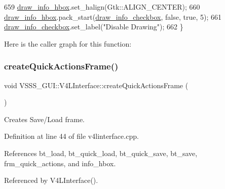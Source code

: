 \begin{DoxyCode}
659         \hyperlink{class_v_s_s_s___g_u_i_1_1_v4_l_interface_a12074ba62f181477daaafc7110edc661}{draw\_info\_hbox}.set\_halign(Gtk::ALIGN\_CENTER);
660         \hyperlink{class_v_s_s_s___g_u_i_1_1_v4_l_interface_a12074ba62f181477daaafc7110edc661}{draw\_info\_hbox}.pack\_start(\hyperlink{class_v_s_s_s___g_u_i_1_1_v4_l_interface_a0bd3c429f8b0d92b2b53353dc31e346e}{draw\_info\_checkbox}, \textcolor{keyword}{false}, \textcolor{keyword}{true}, 5);
661         \hyperlink{class_v_s_s_s___g_u_i_1_1_v4_l_interface_a0bd3c429f8b0d92b2b53353dc31e346e}{draw\_info\_checkbox}.set\_label(\textcolor{stringliteral}{"Disable Drawing"});
662     \}
\end{DoxyCode}
Here is the caller graph for this function\+:
\mbox{\label{class_v_s_s_s___g_u_i_1_1_v4_l_interface_a9e3f937e1515c7b5488520caf924b857}} 
\subsubsection{\texorpdfstring{create\+Quick\+Actions\+Frame()}{createQuickActionsFrame()}}
{\footnotesize\ttfamily void V\+S\+S\+S\+\_\+\+G\+U\+I\+::\+V4\+L\+Interface\+::create\+Quick\+Actions\+Frame (\begin{DoxyParamCaption}{ }\end{DoxyParamCaption})\hspace{0.3cm}{\ttfamily [private]}}



Creates Save/\+Load frame. 



Definition at line 44 of file v4linterface.\+cpp.



References bt\+\_\+load, bt\+\_\+quick\+\_\+load, bt\+\_\+quick\+\_\+save, bt\+\_\+save, frm\+\_\+quick\+\_\+actions, and info\+\_\+hbox.



Referenced by V4\+L\+Interface().


